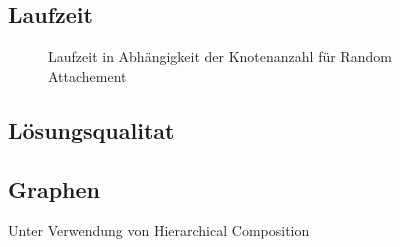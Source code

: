 \subsection{Laufzeit}

\begin{figure}
    \centering
    \subfigure{
        \centering
        \resizebox{0.45\linewidth}{!}{
            
        }
    }
    \subfigure{
        \centering
        \resizebox{0.45\linewidth}{!}{
            
        }
    }
    \subfigure{
        \centering
        \resizebox{0.45\linewidth}{!}{
            
        }
    }
    \subfigure{
        \centering
        \resizebox{0.45\linewidth}{!}{
            
        }
    }
    \caption{Laufzeit in Abhängigkeit der Knotenanzahl für Random Attachement}
\end{figure}

\begin{figure}
    \centering
    \subfigure{
        \centering
        \resizebox{0.45\linewidth}{!}{
            
        }
    }
    \subfigure{
        \centering
        \resizebox{0.45\linewidth}{!}{
            
        }
    }
    \subfigure{
        \centering
        \resizebox{0.45\linewidth}{!}{
            
        }
    }
    \subfigure{
        \centering
        \resizebox{0.45\linewidth}{!}{
            
        }
    }
\end{figure}

\begin{figure}
    \centering
    \subfigure{
        \centering
        \resizebox{0.45\linewidth}{!}{
            
        }
    }
    \subfigure{
        \centering
        \resizebox{0.45\linewidth}{!}{
            
        }
    }
    \subfigure{
        \centering
        \resizebox{0.45\linewidth}{!}{
            
        }
    }
    \subfigure{
        \centering
        \resizebox{0.45\linewidth}{!}{
            
        }
    }
\end{figure}

\subsection{Lösungsqualitat}
\subsection{Graphen}
Unter Verwendung von Hierarchical Composition


